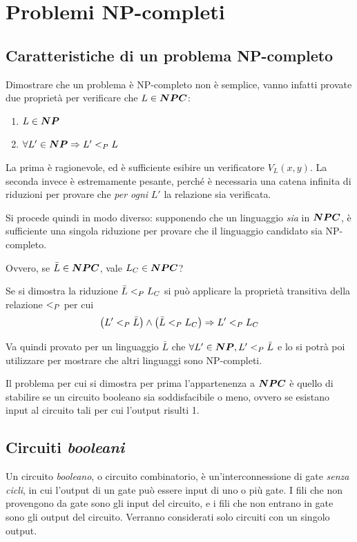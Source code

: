 \section{Problemi NP-completi}

\subsection{Caratteristiche di un problema NP-completo}

Dimostrare che un problema è NP-completo non è semplice, vanno infatti provate due proprietà per verificare che $L \in \bm{NPC}$:
\begin{enumerate}
    \item $L \in \bm{NP}$
    \item $\forall L' \in \bm{NP} \Rightarrow L' <_P L$
\end{enumerate}
La prima è ragionevole, ed è sufficiente esibire un verificatore $V_L(x,y)$. La seconda invece è estremamente pesante, perché è necessaria una catena infinita di riduzioni per provare che \emph{per ogni} $L'$ la relazione sia verificata.

Si procede quindi in modo diverso: supponendo che un linguaggio \emph{sia} in $\bm{NPC}$, è sufficiente una singola riduzione per provare che il linguaggio candidato sia NP-completo.

Ovvero, se $\bar{L} \in \bm{NPC}$, vale $L_C \in \bm{NPC}$?

Se si dimostra la riduzione
$
\bar{L} <_P L_C
$
si può applicare la proprietà transitiva della relazione $<_P$ per cui
\begin{equation*}
    \left( L' <_P \bar{L} \right) \wedge \left( \bar{L} <_P L_C \right) \Rightarrow  L' <_P L_C
\end{equation*}

Va quindi provato per un linguaggio $\bar{L}$ che
$\forall L' \in \bm{NP}, L' <_P \bar{L}$
e lo si potrà poi utilizzare per mostrare che altri linguaggi sono NP-completi.

Il problema per cui si dimostra per prima l'appartenenza a $\bm{NPC}$ è quello di stabilire se un circuito booleano sia soddisfacibile o meno, ovvero se esistano input al circuito tali per cui l'output risulti 1.

\subsection{Circuiti \emph{booleani}}

Un circuito \emph{booleano}, o circuito combinatorio, è un'interconnessione di gate \emph{senza cicli}, in cui l'output di un gate può essere input di uno o più gate. I fili che non provengono da gate sono gli input del circuito, e i fili che non entrano in gate sono gli output del circuito. Verranno considerati solo circuiti con un singolo output.

